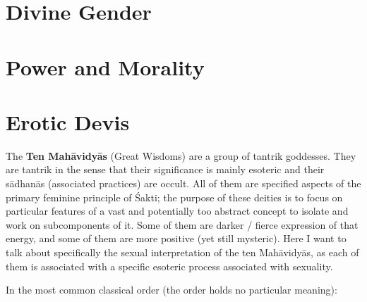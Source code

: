\documentclass[a4paper,14pt]{memoir}
\newcommand{\sadhana}{sādhanā}
\newcommand{\Mahavidya}{Mahāvidyā}
\newcommand{\shakti}{Śakti}
\begin{document}
\section{Divine Gender}

\section{Power and Morality}

\section{Erotic Devis}

The \textbf{Ten \Mahavidya{}s} (Great Wisdoms) are a group of tantrik goddesses. They are tantrik in the sense that their significance is mainly esoteric and their \sadhana{}s (associated practices) are occult. All of them are specified aspects of the primary feminine principle of \shakti{}; the purpose of these deities is to focus on particular features of a vast and potentially too abstract concept to isolate and work on subcomponents of it. Some of them are darker / fierce expression of that energy, and some of them are more positive (yet still mysteric). Here I want to talk about specifically the sexual interpretation of the ten \Mahavidya{}s, as each of them is associated with a specific esoteric process associated with sexuality.

In the most common classical order (the order holds no particular meaning):
\end{document}
